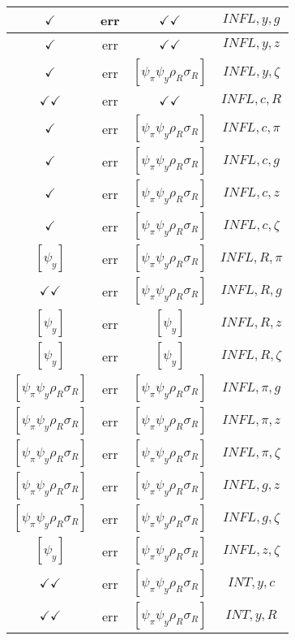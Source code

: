 \documentclass[a4paper,10pt]{article}
\begin{document}
\begin{longtable}{|c|c|c|c|}
\hline
$\checkmark$ & err & $\checkmark\checkmark$ & ${INFL},{y},{g}$ \\
\hline
$\checkmark$ & err & $\checkmark\checkmark$ & ${INFL},{y},{z}$ \\
\hline
$\checkmark$ & err & $[\psi_\pi \psi_y \rho_R \sigma_R ]$ & ${INFL},{y},{\zeta}$ \\
\hline
$\checkmark\checkmark$ & err & $\checkmark\checkmark$ & ${INFL},{c},{R}$ \\
\hline
$\checkmark$ & err & $[\psi_\pi \psi_y \rho_R \sigma_R ]$ & ${INFL},{c},{\pi}$ \\
\hline
$\checkmark$ & err & $[\psi_\pi \psi_y \rho_R \sigma_R ]$ & ${INFL},{c},{g}$ \\
\hline
$\checkmark$ & err & $[\psi_\pi \psi_y \rho_R \sigma_R ]$ & ${INFL},{c},{z}$ \\
\hline
$\checkmark$ & err & $[\psi_\pi \psi_y \rho_R \sigma_R ]$ & ${INFL},{c},{\zeta}$ \\
\hline
$[\psi_y ]$ & err & $[\psi_\pi \psi_y \rho_R \sigma_R ]$ & ${INFL},{R},{\pi}$ \\
\hline
$\checkmark\checkmark$ & err & $[\psi_\pi \psi_y \rho_R \sigma_R ]$ & ${INFL},{R},{g}$ \\
\hline
$[\psi_y ]$ & err & $[\psi_y ]$ & ${INFL},{R},{z}$ \\
\hline
$[\psi_y ]$ & err & $[\psi_y ]$ & ${INFL},{R},{\zeta}$ \\
\hline
$[\psi_\pi \psi_y \rho_R \sigma_R ]$ & err & $[\psi_\pi \psi_y \rho_R \sigma_R ]$ & ${INFL},{\pi},{g}$ \\
\hline
$[\psi_\pi \psi_y \rho_R \sigma_R ]$ & err & $[\psi_\pi \psi_y \rho_R \sigma_R ]$ & ${INFL},{\pi},{z}$ \\
\hline
$[\psi_\pi \psi_y \rho_R \sigma_R ]$ & err & $[\psi_\pi \psi_y \rho_R \sigma_R ]$ & ${INFL},{\pi},{\zeta}$ \\
\hline
$[\psi_\pi \psi_y \rho_R \sigma_R ]$ & err & $[\psi_\pi \psi_y \rho_R \sigma_R ]$ & ${INFL},{g},{z}$ \\
\hline
$[\psi_\pi \psi_y \rho_R \sigma_R ]$ & err & $[\psi_\pi \psi_y \rho_R \sigma_R ]$ & ${INFL},{g},{\zeta}$ \\
\hline
$[\psi_y ]$ & err & $[\psi_\pi \psi_y \rho_R \sigma_R ]$ & ${INFL},{z},{\zeta}$ \\
\hline
$\checkmark\checkmark$ & err & $[\psi_\pi \psi_y \rho_R \sigma_R ]$ & ${INT},{y},{c}$ \\
\hline
$\checkmark\checkmark$ & err & $[\psi_\pi \psi_y \rho_R \sigma_R ]$ & ${INT},{y},{R}$ \\

\end{longtable}
\end{document}
